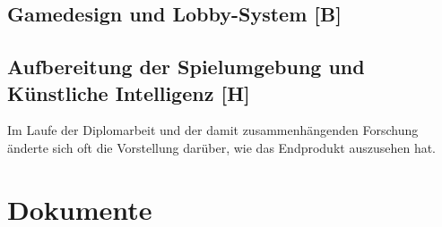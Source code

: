 \subsection{Gamedesign und Lobby-System [B]}

\subsection{Aufbereitung der Spielumgebung und Künstliche Intelligenz [H]}

Im Laufe der Diplomarbeit und der damit zusammenhängenden Forschung änderte sich oft die
Vorstellung darüber, wie das Endprodukt auszusehen hat.


\section{Dokumente}
